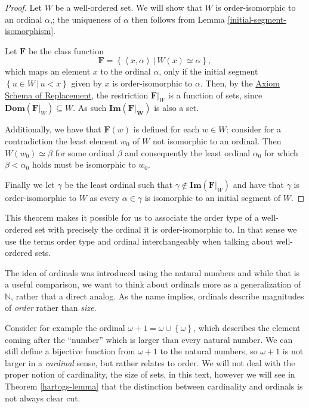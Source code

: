 \documentclass[../../main.tex]{subfiles}
\begin{document}
\begin{proof}
    Let $W$ be a well-ordered set.
    We will show that $W$ is order-isomorphic to an ordinal $\alpha$,; the uniqueness of $\alpha$ then follows from Lemma \ref{initial-segment-isomorphism}.

    Let $\mathbf{F}$ be the class function
    $$\mathbf{F} = \left\{\left<x, \alpha\right> \,\vert\, W(x) \simeq \alpha\right\},$$
    which maps an element $x$ to the ordinal $\alpha$, only if the initial segment $\left\{u \in W \,\vert\, u < x\right\}$ given by $x$ is order-isomorphic to $\alpha$.
    Then, by the \hyperref[ZF8]{Axiom Schema of Replacement}, the restriction $\mathbf{F}\vert_W$ is a function of sets, since $\mathbf{Dom}(\mathbf{F}\vert_W) \subseteq W$.
    As such $\mathbf{Im}(\mathbf{F\vert_W})$ is also a set.

    Additionally, we have that $\mathbf{F}(w)$ is defined for each $w \in W$:
    consider for a contradiction the least element $w_0$ of $W$ not isomorphic to an ordinal.
    Then $W(w_0) \simeq \beta$ for some ordinal $\beta$ and consequently the least ordinal $\alpha_0$ for which $\beta < \alpha_0$ holds must be isomorphic to $w_0$.

    Finally we let $\gamma$ be the least ordinal such that $\gamma \not\in \textbf{Im}(\mathbf{F}\vert_W)$ and have that $\gamma$ is order-isomorphic to $W$ 
    as every $\alpha \in \gamma$ is isomorphic to an initial segment of $W$.
\end{proof}

This theorem makes it possible for us to associate the order type of a well-ordered set with precisely the ordinal it is order-isomorphic to.
In that sense we use the terms order type and ordinal interchangeably when talking about well-ordered sets.

The idea of ordinals was introduced using the natural numbers and while that is a useful comparison, 
we want to think about ordinals more as a generalization of $\mathbb{N}$, rather that a direct analog.
As the name implies, ordinals describe magnitudes of \textit{order} rather than \textit{size}.

Consider for example the ordinal $\omega + 1 = \omega \cup \left\{\omega\right\}$, which describes the element coming after the ``number'' which is larger than every natural number.
We can still define a bijective function from $\omega + 1$ to the natural numbers, so $\omega + 1$ is not larger in a \textit{cardinal} sense, but rather relates to order.
We will not deal with the proper notion of cardinality, the size of sets, in this text, 
however we will see in Theorem \ref{hartogs-lemma} that the distinction between cardinality and ordinals is not always clear cut.
\end{document}
